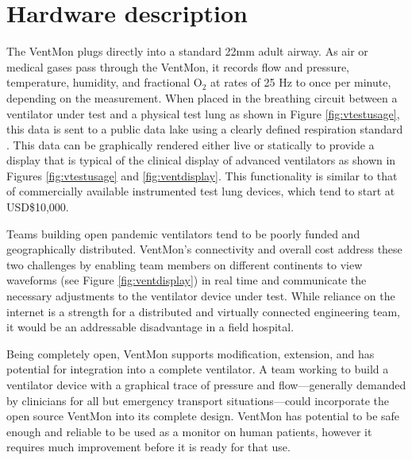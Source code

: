 \documentclass[11pt, letterpaper]{article}
\begin{document}
\section{Hardware description}


The VentMon plugs directly into a standard 22mm adult airway. As air or medical gases pass through the VentMon, it records flow and pressure, temperature, humidity, and fractional O$_2$ at rates of 25 Hz to once per minute, depending on the measurement. When placed in the breathing circuit between a ventilator under test and a physical test lung as shown in Figure \ref{fig:vtestusage}, this data is sent to a public data lake \cite{VentDisplay} using a clearly defined respiration standard \cite{PIRDS}. This data can be graphically rendered either live or statically to provide a display that is typical of the clinical display of advanced ventilators as shown in Figures \ref{fig:vtestusage} and \ref{fig:ventdisplay}. This functionality is similar to that of commercially available instrumented test lung devices, which tend to start at USD\$10,000.

Teams building open pandemic ventilators tend to be poorly funded and geographically distributed. VentMon's connectivity and overall cost address these two challenges by enabling team members on different continents to view waveforms (see Figure  \ref{fig:ventdisplay}) in real time and communicate the necessary adjustments to the ventilator device under test. While reliance on the internet is a strength for a distributed and virtually connected engineering team, it would be an addressable disadvantage in a field hospital.

Being completely open, VentMon supports modification, extension, and has potential for integration into a complete ventilator. A team working to build a ventilator device with a graphical trace of pressure and flow---generally demanded by clinicians for all but emergency transport situations---could incorporate the open source VentMon into its complete design. VentMon has potential to be safe enough and reliable to be used as a monitor on human patients, however it requires much improvement before it is ready for that use.
\\
\end{document}
